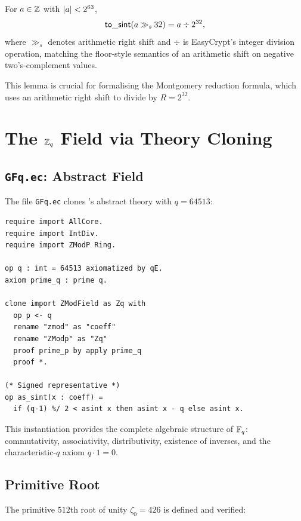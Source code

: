 \begin{lemma}
  For $a \in \mathbb{Z}$ with $\left|a\right| < 2^{63}$,
  \[
    \mathsf{to\_sint}(a \mathbin{\gg_s} 32) = a \div 2^{32},
  \]
  where $\gg_s$ denotes arithmetic right shift and $\div$ is EasyCrypt's
  integer division operation, matching the floor-style semantics of an
  arithmetic shift on negative two's-complement values.
\label{lem:arith_shift}
\end{lemma}

This lemma is crucial for formalising the Montgomery reduction formula, which
uses an arithmetic right shift to divide by $R = 2^{32}$.

\section{The \texorpdfstring{$\mathbb{Z}_q$}{Zq} Field via Theory Cloning}

\subsection{\texttt{GFq.ec}: Abstract Field}

The file \texttt{GFq.ec} clones \easycrypt{}'s abstract  theory
with $q = 64513$:

\begin{lstlisting}[language=EasyCrypt,
  caption={\texttt{GFq.ec}: Galois field instantiation},
  label={lst:gfq}]
require import AllCore.
require import IntDiv.
require import ZModP Ring.

op q : int = 64513 axiomatized by qE.
axiom prime_q : prime q.

clone import ZModField as Zq with
  op p <- q
  rename "zmod" as "coeff"
  rename "ZModp" as "Zq"
  proof prime_p by apply prime_q
  proof *.

(* Signed representative *)
op as_sint(x : coeff) =
  if (q-1) %/ 2 < asint x then asint x - q else asint x.
\end{lstlisting}

This instantiation provides the complete algebraic structure of $\mathbb{F}_q$:
commutativity, associativity, distributivity, existence of inverses, and the
characteristic-$q$ axiom $q \cdot 1 = 0$.

\subsection{Primitive Root}

The primitive $512$th root of unity $\zeta_0 = 426$ is defined and verified:

